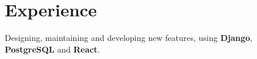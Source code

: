 \documentclass[]{deedy-resume-openfont}
\begin{document}
\begin{minipage}[t]{0.66\textwidth} 


\section{Experience}
\vspace{\topsep} %
\begin{tightemize}
\item Designing, maintaining and developing new features, using \textbf{Django}, \textbf{PostgreSQL} and \textbf{React}.
\end{tightemize}
\sectionsep





\end{minipage}
\end{document}
